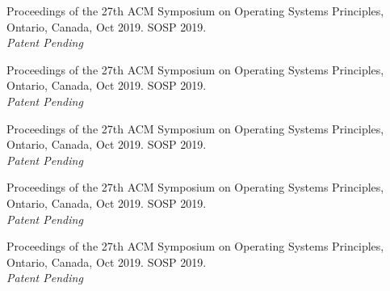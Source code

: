 \documentclass[10pt]{article} %
\begin{document}
{
Proceedings of the 27th ACM
Symposium on Operating Systems Principles, Ontario, Canada, Oct 2019. SOSP 2019.  \\ \textit{Patent Pending} 
}

{
Proceedings of the 27th ACM
Symposium on Operating Systems Principles, Ontario, Canada, Oct 2019. SOSP 2019.  \\ \textit{Patent Pending} 
}

{
Proceedings of the 27th ACM
Symposium on Operating Systems Principles, Ontario, Canada, Oct 2019. SOSP 2019.  \\ \textit{Patent Pending} 
}

{
Proceedings of the 27th ACM
Symposium on Operating Systems Principles, Ontario, Canada, Oct 2019. SOSP 2019.  \\ \textit{Patent Pending} 
}


{
Proceedings of the 27th ACM
Symposium on Operating Systems Principles, Ontario, Canada, Oct 2019. SOSP 2019.  \\ \textit{Patent Pending} 
}



\end{document}
